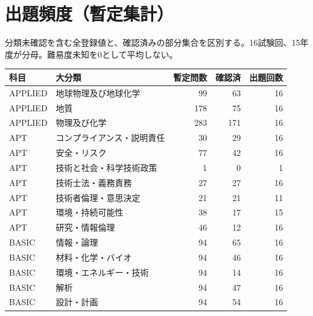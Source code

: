 \chapter{出題頻度（暫定集計）}
分類未確認を含む全登録値と、確認済みの部分集合を区別する。16試験回、15年度が分母。難易度未知を0として平均しない。
\begin{longtable}{p{.16\linewidth}p{.42\linewidth}rrr}
科目 & 大分類 & 暫定問数 & 確認済 & 出題回数\\\hline
APPLIED & 地球物理及び地球化学 & 99 & 63 & 16\\
APPLIED & 地質 & 178 & 75 & 16\\
APPLIED & 物理及び化学 & 283 & 171 & 16\\
APT & コンプライアンス・説明責任 & 30 & 29 & 16\\
APT & 安全・リスク & 77 & 42 & 16\\
APT & 技術と社会・科学技術政策 & 1 & 0 & 1\\
APT & 技術士法・義務責務 & 27 & 27 & 16\\
APT & 技術者倫理・意思決定 & 21 & 21 & 11\\
APT & 環境・持続可能性 & 38 & 17 & 15\\
APT & 研究・情報倫理 & 46 & 12 & 16\\
BASIC & 情報・論理 & 94 & 65 & 16\\
BASIC & 材料・化学・バイオ & 94 & 46 & 16\\
BASIC & 環境・エネルギー・技術 & 94 & 14 & 16\\
BASIC & 解析 & 94 & 47 & 16\\
BASIC & 設計・計画 & 94 & 54 & 16\\
\end{longtable}
